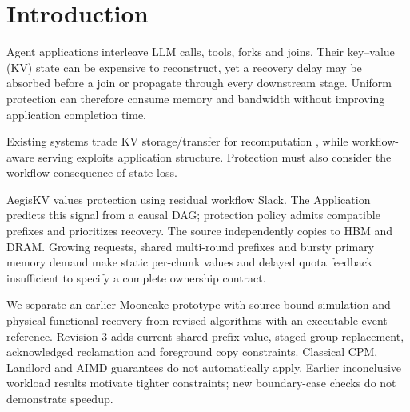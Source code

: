 \section{Introduction}
Agent applications interleave LLM calls, tools, forks and joins. Their
key--value (KV) state can be expensive to reconstruct, yet a recovery delay
may be absorbed before a join or propagate through every downstream stage.
Uniform protection can therefore consume memory and bandwidth without
improving application completion time.

Existing systems trade KV storage/transfer for recomputation
\cite{qin2025mooncake,strati2024dejavu,jayakody2026ghostserve}, while workflow-aware
serving exploits application structure\cite{lin2024parrot,pan2025kvflow,yu2026pythia}.
Protection must also consider the workflow consequence of state loss.

AegisKV values protection using residual workflow Slack. The Application
predicts this signal from a causal DAG; protection policy admits compatible
prefixes and prioritizes recovery. The source independently copies to HBM
and DRAM. Growing requests, shared multi-round prefixes and bursty primary
memory demand make static per-chunk values and delayed quota feedback
insufficient to specify a complete ownership contract.

We separate an earlier Mooncake prototype with source-bound simulation and
physical functional recovery from revised algorithms with an executable event
reference. Revision 3 adds current shared-prefix value, staged group replacement,
acknowledged reclamation and foreground copy constraints. Classical CPM,
Landlord and AIMD guarantees\cite{kelley1959cpm,young2002landlord,chiu1989aimd}
do not automatically apply. Earlier inconclusive workload results motivate
tighter constraints; new boundary-case checks do not demonstrate speedup.
